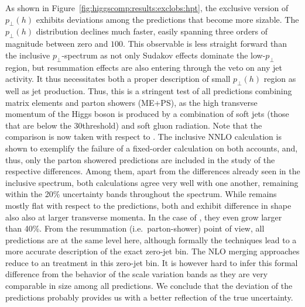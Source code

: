 As shown in Figure~\ref{fig:higgscomp:results:exclobs:hpt}, the
exclusive version of $p_\perp(h)$ exhibits deviations among the
predictions that become more sizable. The $p_\perp(h)$ distribution 
declines much faster, easily spanning three orders of magnitude 
between zero and $100$\gev. This observable is less straight forward 
than the inclusive $p_\perp$-spectrum as not only Sudakov effects 
dominate the low-$p_\perp$ region, but resummation effects are also 
entering through the veto on any jet activity. It thus necessitates 
both a proper description of small $p_\perp(h)$ region as well as 
jet production. Thus,
this is a stringent test of all predictions combining matrix elements and parton showers (ME+PS), as
the high transverse momentum of the Higgs boson is produced by a
combination of soft jets (those that are below the $30$\gev threshold)
and soft gluon radiation. Note that the comparison is now taken with respect to
\Powheg \NNLOPS. The inclusive 
NNLO calculation is shown to exemplify the failure of a fixed-order 
calculation on both accounts, and, thus, only the parton showered 
predictions are included in the study of the respective differences. 
Among them, apart from the differences already seen in the inclusive 
spectrum, both \NNLOPS calculations agree very well with one another, 
remaining within the 20\% uncertainty bands throughout the spectrum. 
While \Sherpa \MEPSatNLO remains mostly flat with respect to the \NNLOPS 
predictions, both \MGaMC and \Herwig exhibit difference in shape also 
also at larger transverse momenta. In the case
of \Herwig, they even grow larger than 40\%. 
From the resummation (i.e.~parton-shower)
point of view, all predictions are at the same level here, although
formally the \NNLOPS techniques lead to a more accurate description of
the exact zero-jet bin. The NLO merging approaches reduce to an \NLOPS
treatment in this zero-jet bin. It is however hard to infer this
formal difference from the behavior of the scale variation bands as
they are very comparable in size among all predictions. We conclude
that the deviation of the predictions probably provides us with a
better reflection of the true uncertainty.

